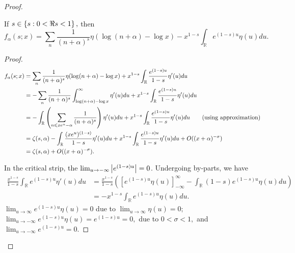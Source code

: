 \begin{proof}
\begin{lemma}
    If $s \in \left\{ s: 0 < \Re s < 1 \right\},$ then 
    \begin{equation}
        f_\alpha(s; x) = \sum_n \frac{1}{(n+\alpha)^s} \eta(\log (n+\alpha) - \log x) - x^{1-s}\int_{\mathbb{R}} e^{(1-s)u} \eta(u) du.
    \end{equation}
\end{lemma}

\begin{proof}
\begin{align*}
    f_\alpha(s; x) &= \sum_n \frac{1}{(n+\alpha)^s} \eta(\log (n+\alpha) - \log x) + x^{1-s}\int_{\mathbb{R}} \frac{e^{(1-s)u}}{1-s} \eta'(u) du \\
    &= -\sum_n \frac{1}{(n+\alpha)^s} \int_{\log (n+\alpha) - \log x}^\infty \eta'(u) du + x^{1-s}\int_{\mathbb{R}} \frac{e^{(1-s)u}}{1-s} \eta'(u) du \\
    &= -\int_{\mathbb{R}} \left( \sum_{n \leqslant xe^u - \alpha} \frac{1}{(n+\alpha)^s} \right) \eta'(u) du + x^{1-s}\int_{\mathbb{R}} \frac{e^{(1-s)u}}{1-s} \eta'(u) du \qquad (\text{using approximation})\\
    &= \zeta(s, \alpha) - \int_{\mathbb{R}} \frac{(xe^u)^{(1-s)}}{1-s} \eta'(u) du + x^{1-s}\int_{\mathbb{R}} \frac{e^{(1-s)u}}{1-s} \eta'(u) du + O((x+\alpha)^{-\sigma}) \\
    &= \zeta(s, \alpha) + O((x+\alpha)^{-\sigma}).
\end{align*}

In the critical strip, the $\lim_{u \to -\infty} \left\lvert e^{(1-s)u} \right\rvert = 0$. Undergoing by-parts, we have
\begin{align*}
    \frac{x^{1-s}}{1-s} \int_{\mathbb{R}}  e^{(1-s)u} \eta'(u) du &= \frac{x^{1-s}}{1-s} \left( [e^{(1-s)u} \eta(u)]_{-\infty}^\infty - \int_{\mathbb{R}} (1-s) e^{(1-s)u} \eta(u) du \right) \\
    &= -x^{1-s} \int_{\mathbb{R}} e^{(1-s)u} \eta(u) du.
\end{align*}
$\lim_{u \to \infty} e^{(1-s)u} \eta(u) = 0$ due to $\lim_{u \to \infty} \eta(u) = 0;$ $\lim_{u \to -\infty} e^{(1-s)u} \eta(u) = e^{(1-s)u} = 0,$ due to $0 < \sigma < 1,$ and $\lim_{u \to -\infty} e^{(1-s)u} = 0.$
\end{proof}


\end{proof}
